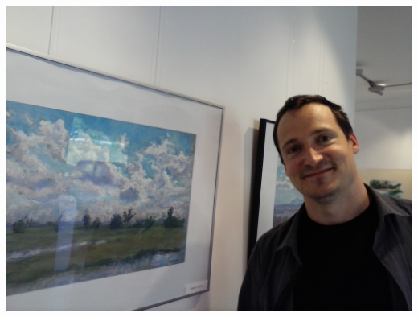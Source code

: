 \documentclass[a4paper,twoside, svgnames]{article}
\begin{document}
\begin{multicols}{2}
\begin{onehalfspacing}
\begin{justify}
\begin{center}
\includegraphics[width=\linewidth]{images/CAM04603}
\end{center}



        \end{justify}
     \end{onehalfspacing}
\end{multicols}
\end{document}

